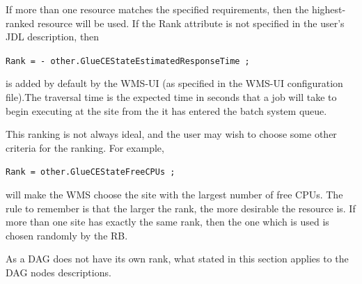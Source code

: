 If more than one resource matches the specified requirements, then the highest-ranked resource will
be used. If the Rank attribute is not specified in the user's JDL description, then

\smallskip
\begin{scriptsize}
\verb!Rank = - other.GlueCEStateEstimatedResponseTime ;!
\end{scriptsize}
\smallskip

is added by default by the WMS-UI (as specified in the WMS-UI configuration file).The traversal time is 
the expected time in seconds that a job will take to begin executing at the site from the it has 
entered the batch system queue.

This ranking is not always ideal, and the user may wish to choose some other criteria for the 
ranking. For example,

\smallskip
\begin{scriptsize}
\verb!Rank = other.GlueCEStateFreeCPUs ;!
\end{scriptsize}
\smallskip

will make the WMS choose the site with the largest number of free CPUs. The rule to remember is that 
the larger the rank, the more desirable the resource is. If more than one site has exactly the same 
rank, then the one which is used is chosen randomly by the RB.

As a DAG does not have its own rank, what stated in this section applies to the DAG nodes descriptions. 
